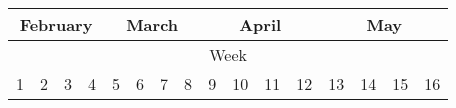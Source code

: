 \documentclass{article}
\begin{document}
\begin{center}
{\renewcommand{\arraystretch}{1.5}%
\begin{tabular}{|c|c|c|c|c|c|c|c|c|c|c|c|c|c|c|c|}
\hline
\multicolumn{4}{|c|}{February} &
\multicolumn{4}{|c|}{March} &
\multicolumn{4}{|c|}{April} &
\multicolumn{4}{|c|}{May} \\
\hline
\multicolumn{16}{|c|}{Week} \\
\hline
1 & 2 & 3 & 4 & 5 & 6 & 7 & 8 & 9 & 10 & 11 & 12 & 13 & 14 & 15 & 16 \\
\hline
\end{tabular}
}
\end{center}
\end{document}
